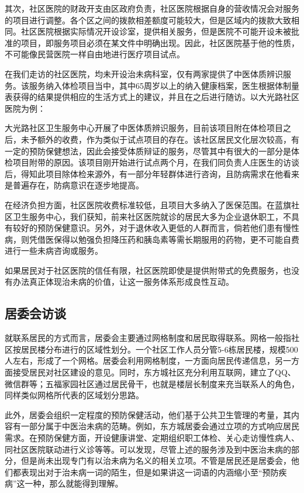 \documentclass{article}
\begin{document}
    其次，社区医院的财政开支由区政府负责，社区医院根据自身的营收情况会对服务的项目进行调整。各个区之间的拨款相差额度可能较大，但是区域内的拨款大致相同。社区医院根据实际情况开设诊室，提供相关服务，但是医院不可能开设未被批准的项目，即服务项目必须在某文件中明确出现。因此，社区医院基于他的性质，不可能像民营医院一样自由地进行医疗项目试点。
    
    在我们走访的社区医院，均未开设治未病科室，仅有两家提供了中医体质辨识服务。该服务纳入体检项目当中，其中65周岁以上的纳入健康档案，医生根据体制量表获得的结果提供相应的生活方式上的建议，并且在之后进行随访。以大光路社区医院为例：
    
    大光路社区卫生服务中心开展了中医体质辨识服务，目前该项目附在体检项目之后，未予额外的收费，作为类似于试点项目的存在。该社区居民文化层次较高，有一定的预防保健想法，因此会接受体质辩证的服务，尽管其中有很大的一部分是体检项目附带的原因。该项目刚开始进行试点两个月，在我们同负责人庄医生的访谈后，得知此项目除体检来源外，有一部分年轻群体进行咨询，且防病需求在他看来是普遍存在，防病意识在逐步地提高。
    
    在经济负担方面，社区医院收费标准较低，且项目大多纳入了医保范围。在蓝旗社区卫生服务中心，我们获知，前来社区医院就诊的居民大多为企业退休职工，不具有较好的预防保健意识。另外，对于退休收入更低的人群而言，倘若他们患有慢性病，则凭借医保得以勉强负担降压药和胰岛素等需长期服用的药物，更不可能自费进行一些未病咨询或服务。
    
    如果居民对于社区医院的信任有限，社区医院即使是提供附带式的免费服务，也没有办法真正体现治未病的价值，让这一服务体系形成良性互动。
    
    \subsection{居委会访谈}
    就联系居民的方式而言，居委会主要通过网格制度和居民取得联系。网格一般指社区按居民楼分布进行的区域性划分。一个社区工作人员分管5-6栋居民楼，规模500人左右，形成了一个网格。居委会利用网格制度，一方面向居民传递信息，另一方面接受居民对社区建设的意见。同时，东方城社区充分利用互联网，建立了QQ、微信群等；五福家园社区通过居民骨干，也就是楼层长制度来充当联系人的角色，同样类似网格所代表的区域划分思路。
    
    此外，居委会组织一定程度的预防保健活动，他们基于公共卫生管理的考量，其内容有一部分属于中医治未病的范畴。例如，东方城居委会通过立项的方式响应居民需求。在预防保健方面，开设健康讲堂、定期组织职工体检、关心走访慢性病人、同社区医院联动进行义诊等等。可以发现，尽管上述的服务涉及到中医治未病的部分，但是尚未出现专门有以治未病为名义的相关立项。不管是居民还是居委会，他们都表现出对于治未病一词的陌生，但是如果讲这一词语的内涵缩小至“预防疾病”这一种，那么就能得到理解。
   \clearpage
\end{document}
